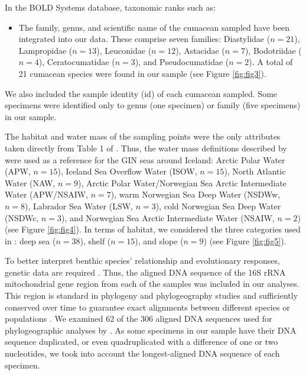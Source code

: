 In the BOLD Systems database, taxonomic ranks such as: 
\begin{itemize}
\item The family, genus, and scientific name of the cumacean sampled have been integrated into our data. These comprise seven families: Diastylidae ($n=21$), Lampropidae ($n=13$), Leuconidae ($n=12$), Astacidae ($n=7$), Bodotriidae ($n=4$), Ceratocumatidae ($n=3$), and Pseudocumatidae ($n=2$). A total of 21 cumacean species were found in our sample (see Figure \ref{fig:fig3}).
\end{itemize}

We also included the sample identity (id) of each cumacean sampled. Some specimens were identified only to genus (one specimen) or family (five specimens) in our sample.
 
The habitat and water mass of the sampling points were the only attributes taken directly from Table 1 of \citep{uhlir_adding_2021}. Thus, the water mass definitions described by \citep{hansen_north_2000, brix2010distribution, ostmann_marine_2014} were used as a reference for the GIN seas around Iceland: Arctic Polar Water (APW, $n=15$), Iceland Sea Overflow Water (ISOW, $n=15$), North Atlantic Water (NAW, $n=9$), Arctic Polar Water/Norwegian Sea Arctic Intermediate Water (APW/NSAIW, $n=7$), warm Norwegian Sea Deep Water (NSDWw, $n=8$), Labrador Sea Water (LSW, $n=3$), cold Norwegian Sea Deep Water (NSDWc, $n=3$), and Norwegian Sea Arctic Intermediate Water (NSAIW, $n=2$) (see Figure \ref{fig:fig4}). In terms of habitat, we considered the three categories used in \citep{uhlir_adding_2021}: deep sea ($n=38$), shelf ($n=15$), and slope ($n=9$) (see Figure \ref{fig:fig5}).

To better interpret benthic species' relationship and evolutionary responses, genetic data are required \citep{wilson_speciation_1987, uhlir_adding_2021}. Thus, the aligned DNA sequence of the 16S rRNA mitochondrial gene region from each of the samples was included in our analyses. This region is standard in phylogeny and phylogeography studies \citep{hugenholtz1998impact} and sufficiently conserved over time to guarantee exact alignments between different species or populations \citep{saccone1999evolutionary}. We examined 62 of the 306 aligned DNA sequences used for phylogeographic analyses by \citep{uhlir_adding_2021}. As some specimens in our sample have their DNA sequence duplicated, or even quadruplicated with a difference of one or two nucleotides, we took into account the longest-aligned DNA sequence of each specimen.

